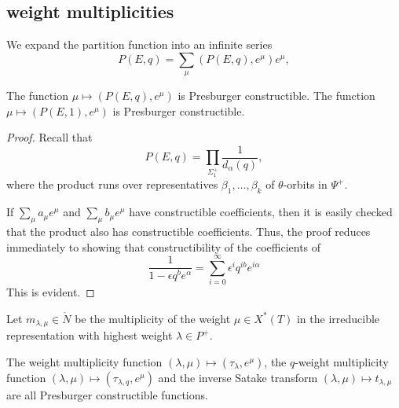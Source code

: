 


\subsection{weight multiplicities}

We expand the partition function into an infinite series
\[
P(E,q) = \sum_\mu (P(E,q),e^\mu) e^{\mu},
\]

\begin{lemma}\label{lemma:partition}
The function $\mu\mapsto (P(E,q),e^\mu)$ is Presburger constructible.
The function $\mu\mapsto (P(E,1),e^\mu)$ is Presburger constructible.
\end{lemma}

\begin{proof} 
Recall that
\[
P(E,q) = \prod_{\Sigma_1^+} \frac{1}{d_\alpha(q)},
\]
where the product runs over representatives $\beta_1,\ldots,\beta_k$ of $\theta$-orbits in $\Psi^+$.

If $\sum_\mu a_\mu e^\mu$ and $\sum_\mu b_\mu e^\mu$ have constructible coefficients, then it is
easily checked that the product also has constructible coefficients.  Thus, the proof reduces immediately
to showing that constructibility of the coefficients of 
\[
\frac{1}{1-\epsilon q^b e^\alpha} = \sum_{i=0}^\infty \epsilon^i q^{i b} e^{i\alpha}
\]
This is evident.
\end{proof}




Let $m_{\lambda,\mu}\in \ring{N}$ be the multiplicity of the weight $\mu\in X^*(T)$
in the irreducible representation with highest weight $\lambda\in P^+$.


\begin{lemma}  The weight multiplicity function $(\lambda,\mu)\mapsto (\tau_\lambda,e^\mu)$, the $q$-weight multiplicity
function $(\lambda,\mu)\mapsto (\tau_{\lambda,q},e^\mu)$  and the inverse Satake transform $(\lambda,\mu)\mapsto t_{\lambda,\mu}$
are all Presburger constructible functions.
\end{lemma}

